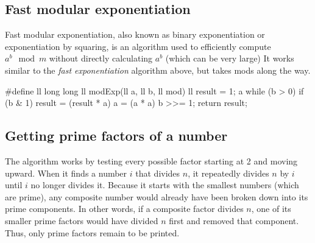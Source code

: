\documentclass{report}
\begin{document}
\subsection{Fast modular exponentiation}
\bigbreak \noindent 
Fast modular exponentiation, also known as binary exponentiation or exponentiation by squaring, is an algorithm used to efficiently compute $a^{b} \mod m $ without directly calculating $a^{b}$ (which can be very large)
\bigbreak \noindent 
It works similar to the \textit{fast exponentiation} algorithm above, but takes mods along the way.
\bigbreak \noindent 
\begin{cppcode}
    #define ll long long
    ll modExp(ll a, ll b, ll mod) {
        ll result = 1;
        a %
        while (b > 0) {
            if (b & 1)
            result = (result * a) %
            a = (a * a) %
            b >>= 1;
        }
        return result;
    }
\end{cppcode}


\pagebreak 
{}
\bigbreak \noindent 

\subsection{Getting prime factors of a number}
\bigbreak \noindent 
{}
\bigbreak \noindent 
The algorithm works by testing every possible factor starting at 2 and moving upward. When it finds a number $i$ that divides $n$, it repeatedly divides $n$ by $i$ until $i$ no longer divides it. Because it starts with the smallest numbers (which are prime), any composite number would already have been broken down into its prime components. In other words, if a composite factor divides $n$, one of its smaller prime factors would have divided $n$ first and removed that component. Thus, only prime factors remain to be printed.
\end{document}
